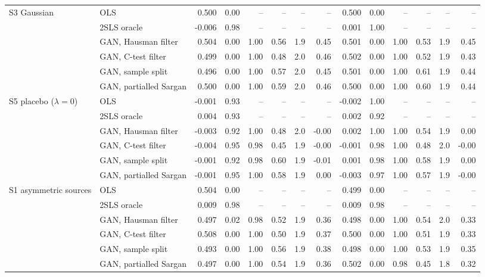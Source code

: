 \begin{table}[p]
\begin{tabular}{@{}llrrrrrrrrrrrr@{}}
\addlinespace
S3 Gaussian & OLS & 0.500 & 0.00 & -- & -- & -- & -- & 0.500 & 0.00 & -- & -- & -- & -- \\
 & 2SLS oracle & -0.006 & 0.98 & -- & -- & -- & -- & 0.001 & 1.00 & -- & -- & -- & -- \\
 & GAN, Hausman filter & 0.504 & 0.00 & 1.00 & 0.56 & 1.9 & 0.45 & 0.501 & 0.00 & 1.00 & 0.53 & 1.9 & 0.45 \\
 & GAN, C-test filter & 0.499 & 0.00 & 1.00 & 0.48 & 2.0 & 0.46 & 0.502 & 0.00 & 1.00 & 0.52 & 1.9 & 0.43 \\
 & GAN, sample split & 0.496 & 0.00 & 1.00 & 0.57 & 2.0 & 0.45 & 0.501 & 0.00 & 1.00 & 0.61 & 1.9 & 0.44 \\
 & GAN, partialled Sargan & 0.500 & 0.00 & 1.00 & 0.59 & 2.0 & 0.46 & 0.500 & 0.00 & 1.00 & 0.60 & 1.9 & 0.44 \\
\addlinespace
S5 placebo ($\lambda=0$) & OLS & -0.001 & 0.93 & -- & -- & -- & -- & -0.002 & 1.00 & -- & -- & -- & -- \\
 & 2SLS oracle & 0.004 & 0.93 & -- & -- & -- & -- & 0.002 & 0.92 & -- & -- & -- & -- \\
 & GAN, Hausman filter & -0.003 & 0.92 & 1.00 & 0.48 & 2.0 & -0.00 & 0.002 & 1.00 & 1.00 & 0.54 & 1.9 & 0.00 \\
 & GAN, C-test filter & -0.004 & 0.95 & 0.98 & 0.45 & 1.9 & -0.00 & -0.001 & 0.98 & 1.00 & 0.48 & 2.0 & -0.00 \\
 & GAN, sample split & -0.001 & 0.92 & 0.98 & 0.60 & 1.9 & -0.01 & 0.001 & 0.98 & 1.00 & 0.58 & 1.9 & 0.00 \\
 & GAN, partialled Sargan & -0.001 & 0.95 & 1.00 & 0.58 & 1.9 & 0.00 & -0.003 & 0.97 & 1.00 & 0.57 & 1.9 & -0.00 \\
\addlinespace
S1 asymmetric sources & OLS & 0.504 & 0.00 & -- & -- & -- & -- & 0.499 & 0.00 & -- & -- & -- & -- \\
 & 2SLS oracle & 0.009 & 0.98 & -- & -- & -- & -- & 0.009 & 0.98 & -- & -- & -- & -- \\
 & GAN, Hausman filter & 0.497 & 0.02 & 0.98 & 0.52 & 1.9 & 0.36 & 0.498 & 0.00 & 1.00 & 0.54 & 2.0 & 0.33 \\
 & GAN, C-test filter & 0.508 & 0.00 & 1.00 & 0.50 & 1.9 & 0.37 & 0.500 & 0.00 & 1.00 & 0.51 & 1.9 & 0.33 \\
 & GAN, sample split & 0.493 & 0.00 & 1.00 & 0.56 & 1.9 & 0.38 & 0.498 & 0.00 & 1.00 & 0.53 & 1.9 & 0.35 \\
 & GAN, partialled Sargan & 0.497 & 0.00 & 1.00 & 0.54 & 1.9 & 0.36 & 0.502 & 0.00 & 0.98 & 0.45 & 1.8 & 0.32 \\

\end{tabular}
\end{table}

